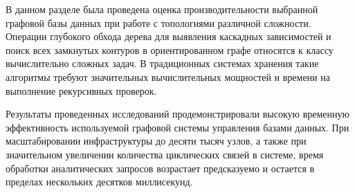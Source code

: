 В данном разделе была проведена оценка производительности 
выбранной графовой базы данных при работе с топологиями различной сложности. 
Операции глубокого обхода дерева для выявления каскадных зависимостей и поиск 
всех замкнутых контуров в ориентированном графе относятся к классу вычислительно 
сложных задач. В традиционных системах хранения такие алгоритмы требуют значительных 
вычислительных мощностей и времени на выполнение рекурсивных проверок.

Результаты проведенных исследований продемонстрировали высокую временную 
эффективность используемой графовой системы управления базами данных. При 
масштабировании инфраструктуры до десяти тысяч узлов, а также при значительном 
увеличении количества циклических связей в системе, время обработки аналитических 
запросов возрастает предсказуемо и остается в пределах нескольких десятков миллисекунд.